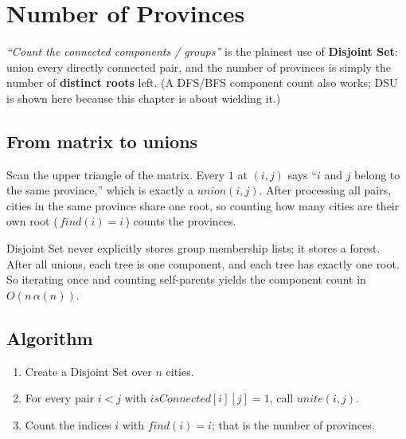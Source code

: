 \section{Number of Provinces}
\label{sec:graph-number-of-provinces}


\begin{patternbox}
\emph{``Count the connected components / groups''} is the plainest use
of \textbf{Disjoint Set}: union every directly connected pair, and the
number of provinces is simply the number of \textbf{distinct roots}
left. (A DFS/BFS component count also works; DSU is shown here because
this chapter is about wielding it.)
\end{patternbox}

\subsection*{From matrix to unions}

Scan the upper triangle of the matrix. Every $1$ at $(i,j)$ says ``$i$
and $j$ belong to the same province,'' which is exactly a
$\textit{union}(i,j)$. After processing all pairs, cities in the same
province share one root, so counting how many cities are their own root
(\,$\textit{find}(i)=i$\,) counts the provinces.

\begin{ideabox}[Components = Number of Distinct Roots]
Disjoint Set never explicitly stores group membership lists; it stores a
forest. After all unions, each tree is one component, and each tree has
exactly one root. So iterating once and counting self-parents yields the
component count in $O(n\,\alpha(n))$.
\end{ideabox}

\subsection*{Algorithm}

\begin{enumerate}
  \item Create a Disjoint Set over $n$ cities.
  \item For every pair $i<j$ with $\textit{isConnected}[i][j]=1$, call
        $\textit{unite}(i,j)$.
  \item Count the indices $i$ with $\textit{find}(i)=i$; that is the
        number of provinces.
\end{enumerate}

